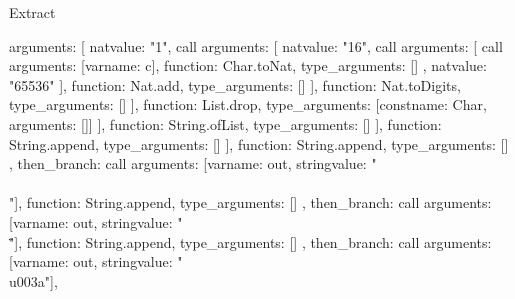 \begin{lexlean}{Extract}
\begin{toolingmodule}
{{{{{{{{{{{{{                                    arguments: [
                                      nat{value: "1"},
                                      call{
                                        arguments: [
                                          nat{value: "16"},
                                          call{
                                            arguments: [
                                              call{
                                                arguments: [var{name: c}],
                                                function: Char.toNat,
                                                type_arguments: []
                                              },
                                              nat{value: "65536"}
                                            ],
                                            function: Nat.add,
                                            type_arguments: []
                                          }
                                        ],
                                        function: Nat.toDigits,
                                        type_arguments: []
                                      }
                                    ],
                                    function: List.drop,
                                    type_arguments: [const{name: Char, arguments: []}]
                                  }
                                ],
                                function: String.ofList,
                                type_arguments: []
                              }
                            ],
                            function: String.append,
                            type_arguments: []
                          }
                        ],
                        function: String.append,
                        type_arguments: []
                      }
                    },
                    then_branch: call{
                      arguments: [var{name: out}, string{value: "\\\\"}],
                      function: String.append,
                      type_arguments: []
                    }
                  },
                  then_branch: call{
                    arguments: [var{name: out}, string{value: "\\\""}],
                    function: String.append,
                    type_arguments: []
                  }
                },
                then_branch: call{
                  arguments: [var{name: out}, string{value: "\\u003a"}],
}}}}}}}
\end{toolingmodule}
\end{lexlean}
